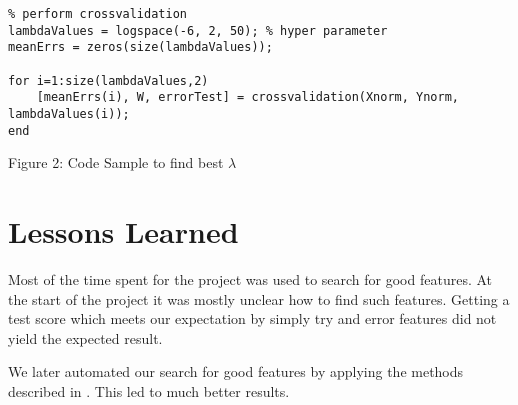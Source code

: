 \documentclass[a4paper, 11pt]{article}
\begin{document}
\begin{center}
\begin{lstlisting} 
% perform crossvalidation
lambdaValues = logspace(-6, 2, 50); % hyper parameter
meanErrs = zeros(size(lambdaValues));

for i=1:size(lambdaValues,2)
    [meanErrs(i), W, errorTest] = crossvalidation(Xnorm, Ynorm, lambdaValues(i));
end
\end{lstlisting}
Figure 2: Code Sample to find best $\lambda$
\end{center}


\section{Lessons Learned} 
Most of the time spent for the project was used to search for good features. At the start of the project  it was mostly unclear how to find such features. Getting a test score which meets our expectation by simply try and error features did not yield the expected result.

We later automated our search for good features by applying the methods described in . This led to much better results.

\end{document}

